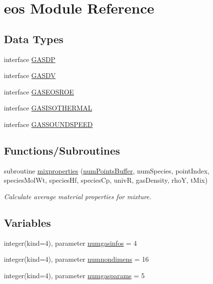 \hypertarget{namespaceeos}{}\section{eos Module Reference}
\label{namespaceeos}
\subsection*{Data Types}
\begin{DoxyCompactItemize}
\item 
interface \hyperlink{interfaceeos_1_1GASDP}{G\+A\+S\+DP}
\item 
interface \hyperlink{interfaceeos_1_1GASDV}{G\+A\+S\+DV}
\item 
interface \hyperlink{interfaceeos_1_1GASEOSROE}{G\+A\+S\+E\+O\+S\+R\+OE}
\item 
interface \hyperlink{interfaceeos_1_1GASISOTHERMAL}{G\+A\+S\+I\+S\+O\+T\+H\+E\+R\+M\+AL}
\item 
interface \hyperlink{interfaceeos_1_1GASSOUNDSPEED}{G\+A\+S\+S\+O\+U\+N\+D\+S\+P\+E\+ED}
\end{DoxyCompactItemize}
\subsection*{Functions/\+Subroutines}
\begin{DoxyCompactItemize}
\item 
subroutine \hyperlink{namespaceeos_aca70c80cb10c8ae79d29cecf6474e85a}{mixproperties} (\hyperlink{WENOKernels_8H_a86c25ff33e6d9bccfabdf45dc5ddf24c}{num\+Points\+Buffer}, num\+Species, point\+Index, species\+Mol\+Wt, species\+Hf, species\+Cp, univR, gas\+Density, rhoY, t\+Mix)
\begin{DoxyCompactList}\small\item\em Calculate average material properties for mixture. \end{DoxyCompactList}\end{DoxyCompactItemize}
\subsection*{Variables}
\begin{DoxyCompactItemize}
\item 
integer(kind=4), parameter \hyperlink{namespaceeos_ae3be5cc8a1583f01f17df576ad87bc32}{numgasinfos} = 4
\item 
integer(kind=4), parameter \hyperlink{namespaceeos_ad4f9e001c613d757ed00087617a0d158}{numnondimens} = 16
\item 
integer(kind=4), parameter \hyperlink{namespaceeos_ad25ac74c4fda2578144b6019873d260d}{numgasparams} = 5
\end{DoxyCompactItemize}



